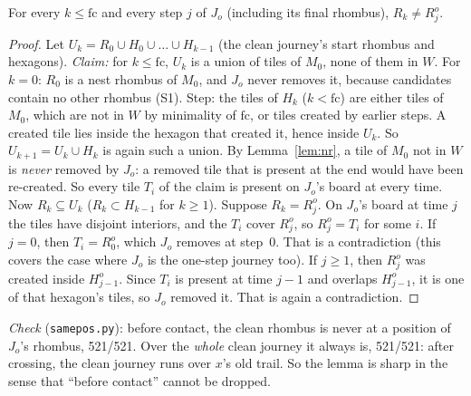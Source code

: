\documentclass[11pt]{article}
\theoremstyle{definition}\newtheorem{definition}[theorem]{Definition}\newtheorem{remark}[theorem]{Remark}
\begin{document}
\begin{lemma}\label{lem:p2}
For every $k\le\mathrm{fc}$ and every step $j$ of $J_o$ (including its final rhombus), $R_k\ne R^o_j$.
\end{lemma}
\begin{proof}
Let $U_k=R_0\cup H_0\cup\dots\cup H_{k-1}$ (the clean journey's start rhombus and hexagons). \emph{Claim:} for $k\le\mathrm{fc}$, $U_k$ is a union of tiles of $M_0$, none of them in $W$.
For $k=0$: $R_0$ is a nest rhombus of $M_0$, and $J_o$ never removes it, because candidates contain no other rhombus (S1). Step: the tiles of $H_k$ ($k<\mathrm{fc}$) are either tiles of $M_0$, which are not in $W$ by minimality of $\mathrm{fc}$, or tiles created by earlier steps. A created tile lies inside the hexagon that created it, hence inside $U_k$. So $U_{k+1}=U_k\cup H_k$ is again such a union.
By Lemma~\ref{lem:nr}, a tile of $M_0$ not in $W$ is \emph{never} removed by $J_o$: a removed tile that is present at the end would have been re-created. So every tile $T_i$ of the claim is present on $J_o$'s board at every time.
Now $R_k\subseteq U_k$ ($R_k\subset H_{k-1}$ for $k\ge1$). Suppose $R_k=R^o_j$. On $J_o$'s board at time $j$ the tiles have disjoint interiors, and the $T_i$ cover $R^o_j$, so $R^o_j=T_i$ for some $i$.
If $j=0$, then $T_i=R^o_0$, which $J_o$ removes at step~$0$. That is a contradiction (this covers the case where $J_o$ is the one-step journey too).
If $j\ge1$, then $R^o_j$ was created inside $H^o_{j-1}$. Since $T_i$ is present at time $j-1$ and overlaps $H^o_{j-1}$, it is one of that hexagon's tiles, so $J_o$ removed it. That is again a contradiction.
\end{proof}
\noindent\emph{Check} (\texttt{samepos.py}): before contact, the clean rhombus is never at a position of $J_o$'s rhombus, 521/521. Over the \emph{whole} clean journey it always is, 521/521: after crossing, the clean journey runs over $x$'s old trail. So the lemma is sharp in the sense that ``before contact'' cannot be dropped.
\end{document}

